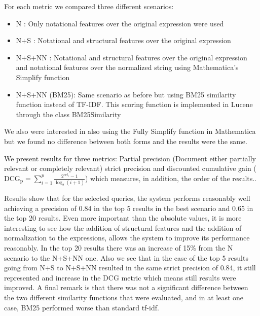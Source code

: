 For each metric we compared three different scenarios:

\begin{itemize}
\item N : Only notational features over the original expression were used
\item N+S : Notational and structural features over the original expression
\item N+S+NN : Notational and structural features over the original expression and notational features over the normalized string using Mathematica's Simplify function
\item N+S+NN (BM25): Same scenario as before but using BM25 similarity function instead of TF-IDF. This scoring function is implemented in Lucene through the class {\codefont BM25Similarity}
\end{itemize}

We also were interested in also using the Fully Simplify function in Mathematica but we found no difference between both forms and the results were the same.

We present results for three metrics: Partial precision (Document either partially relevant or completely relevant) strict precision and discounted cumulative gain ($ \mathrm{DCG_{p}} = \sum_{i=1}^{p} \frac{ 2^{rel_{i}} - 1 }{ \log_{2}(i+1)} $) which measures, in addition, the order of the results..






Results show that for the selected queries, the system performs reasonably well achieving a precision of 0.84 in the top 5 results in the best scenario and 0.65 in the top 20 results. 
Even more important than the absolute values, it is more interesting to see how the addition of structural features and the addition of normalization to the expressions, allows the system to improve its performance reasonably. In the top 20 results there was an increase of 15\% from the N scenario to the N+S+NN one. Also we see that in the case of the top 5 results going from N+S to N+S+NN resulted in the same strict precision of 0.84, it still represented and increase in the DCG metric which means still results were improved. 
A final remark is that there was not a significant difference between the two different similarity functions that were evaluated, and in at least one case, BM25 performed worse than standard tf-idf. 

